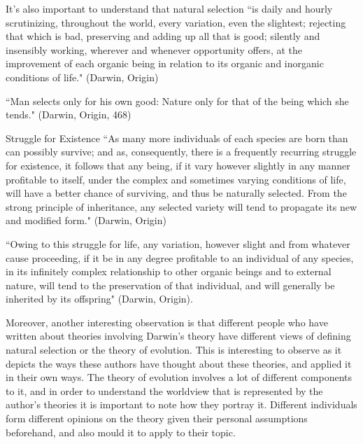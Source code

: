 \documentclass[11pt, oneside]{article}
\begin{document}
\par It's also important to understand that natural selection ``is daily and hourly scrutinizing, throughout the world, every variation, even the slightest; rejecting that which is bad, preserving and adding up all that is good; silently and insensibly working, wherever and whenever opportunity offers, at the improvement of each organic being in relation to its organic and inorganic conditions of life." (Darwin, Origin)

``Man selects only for his own good: Nature only for that of the being which she tends." (Darwin, Origin, 468)

\par Struggle for Existence ``As many more individuals of each species are born than can possibly survive; and as, consequently, there is a frequently recurring struggle for existence, it follows that any being, if it vary however slightly in any manner profitable to itself, under the complex and sometimes varying conditions of life, will have a better chance of surviving, and thus be naturally selected. From the strong principle of inheritance, any selected variety will tend to propagate its new and modified form." (Darwin, Origin)

\par ``Owing to this struggle for life, any variation, however slight and from whatever cause proceeding, if it be in any degree profitable to an individual of any species, in its infinitely complex relationship to other organic beings and to external nature, will tend to the preservation of that individual, and will generally be inherited by its offspring" (Darwin, Origin).


\par Moreover, another interesting observation is that different people who have written about theories involving Darwin's theory have different views of defining natural selection or the theory of evolution. This is interesting to observe as it depicts the ways these authors have thought about these theories, and applied it in their own ways. The theory of evolution involves a lot of different components to it, and in order to understand the worldview that is represented by the author's theories it is important to note how they portray it. Different individuals form different opinions on the theory given their personal assumptions beforehand, and also mould it to apply to their topic.
\end{document}
